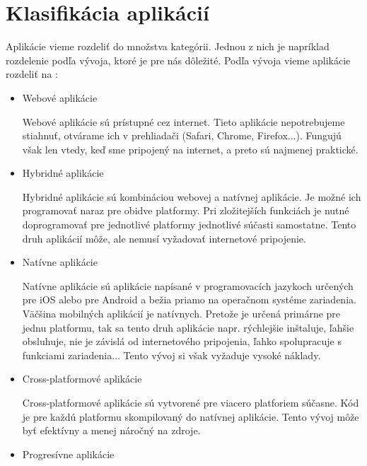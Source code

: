 \documentclass[10pt,twoside,slovak,a4paper]{article}
\begin{document}
\section{Klasifikácia aplikácií}
\quad Aplikácie vieme rozdeliť do množstva kategórii. Jednou z nich je napríklad rozdelenie podľa vývoja, ktoré je pre nás dôležité. Podľa vývoja vieme aplikácie rozdeliť na \cite{winpc}:
\begin{itemize}
\item  Webové aplikácie

Webové aplikácie sú prístupné cez internet. Tieto aplikácie nepotrebujeme stiahnuť, otvárame ich v prehliadači (Safari, Chrome, Firefox...). Fungujú však len vtedy, keď sme pripojený na internet, a preto sú najmenej praktické.

\item Hybridné aplikácie

Hybridné aplikácie sú kombináciou webovej a natívnej aplikácie. Je možné ich programovať naraz pre obidve platformy. Pri zložitejších funkciách je nutné doprogramovať pre jednotlivé platformy jednotlivé súčasti samostatne. Tento druh aplikácií môže, ale nemusí vyžadovať internetové pripojenie.

\item Natívne aplikácie

Natívne aplikácie sú aplikácie napísané v programovacích jazykoch určených pre iOS alebo pre Android a bežia priamo na operačnom systéme zariadenia. Väčšina mobilných aplikácií je natívnych. Pretože je určená primárne pre jednu platformu, tak sa tento druh aplikácie napr. rýchlejšie inštaluje, ľahšie obsluhuje, nie je závislá od internetového pripojenia, ľahko spolupracuje s funkciami zariadenia... Tento vývoj si však vyžaduje vysoké náklady.

\item Cross-platformové aplikácie

Cross-platformové aplikácie sú vytvorené pre viacero platforiem súčasne. Kód je pre každú platformu skompilovaný do natívnej aplikácie. Tento vývoj môže byť efektívny a menej náročný na zdroje.

\item Progresívne aplikácie


\end{itemize}
\end{document}
